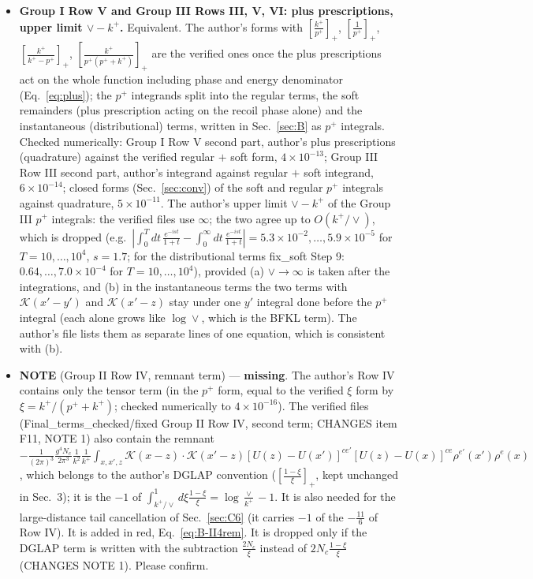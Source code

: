 \documentclass[9pt]{article}
\numberwithin{equation}{section}
\begin{document}
\begin{itemize}
\item[A4] \textbf{Group I Row V and Group III Rows III, V, VI: plus prescriptions, upper limit $\vee-k^{+}$.} Equivalent. The author's forms with $[\frac{k^{+}}{p^{+}}]_{+}$, $[\frac{1}{p^{+}}]_{+}$, $[\frac{k^{+}}{k^{+}-p^{+}}]_{+}$, $[\frac{k^{+}}{p^{+}(p^{+}+k^{+})}]_{+}$ are the verified ones once the plus prescriptions act on the whole function including phase and energy denominator (Eq.~\eqref{eq:plus}); the $p^{+}$ integrands split into the regular terms, the soft remainders (plus prescription acting on the recoil phase alone) and the instantaneous (distributional) terms, written in Sec.~\ref{sec:B} as $p^{+}$ integrals. Checked numerically: Group I Row V second part, author's plus prescriptions (quadrature) against the verified regular $+$ soft form, $4\times10^{-13}$; Group III Row III second part, author's integrand against regular $+$ soft integrand, $6\times10^{-14}$; closed forms (Sec.~\ref{sec:conv}) of the soft and regular $p^{+}$ integrals against quadrature, $5\times10^{-11}$. The author's upper limit $\vee-k^{+}$ of the Group III $p^{+}$ integrals: the verified files use $\infty$; the two agree up to $O(k^{+}/\vee)$, which is dropped (e.g.\ $|\int_{0}^{T}dt\,\frac{e^{-ist}}{1+t}-\int_{0}^{\infty}dt\,\frac{e^{-ist}}{1+t}|=5.3\times10^{-2},\dots,5.9\times10^{-5}$ for $T=10,\dots,10^{4}$, $s=1.7$; for the distributional terms fix\_soft Step 9: $0.64,\dots,7.0\times10^{-4}$ for $T=10,\dots,10^{4}$), provided (a) $\vee\to\infty$ is taken after the integrations, and (b) in the instantaneous terms the two terms with $\mathcal{K}(x'-y')$ and $\mathcal{K}(x'-z)$ stay under one $y'$ integral done before the $p^{+}$ integral (each alone grows like $\log\vee$, which is the BFKL term). The author's file lists them as separate lines of one equation, which is consistent with (b).
\item[A5] {\color{red}\textbf{NOTE} (Group II Row IV, remnant term) --- \textbf{missing}. The author's Row IV contains only the tensor term (in the $p^{+}$ form, equal to the verified $\xi$ form by $\xi=k^{+}/(p^{+}+k^{+})$; checked numerically to $4\times10^{-16}$). The verified files (Final\_terms\_checked/fixed Group II Row IV, second term; CHANGES item F11, NOTE 1) also contain the remnant $-\frac{1}{(2\pi)^{3}}\frac{g^{4}N_{c}}{2\pi^{3}}\frac{1}{k^{2}}\frac{1}{k^{+}}\int_{x,x',z}\mathcal{K}(x-z)\cdot\mathcal{K}(x'-z)[U(z)-U(x')]^{ce'}[U(z)-U(x)]^{ce}\rho^{e'}(x')\rho^{e}(x)$, which belongs to the author's DGLAP convention ($[\frac{1-\xi}{\xi}]_{+}$, kept unchanged in Sec.~3); it is the $-1$ of $\int_{k^{+}/\vee}^{1}d\xi\frac{1-\xi}{\xi}=\log\frac{\vee}{k^{+}}-1$. It is also needed for the large-distance tail cancellation of Sec.~\ref{sec:C6} (it carries $-1$ of the $-\frac{11}{6}$ of Row IV). It is added in red, Eq.~\eqref{eq:B-II4rem}. It is dropped only if the DGLAP term is written with the subtraction $\frac{2N_{c}}{\xi}$ instead of $2N_{c}\frac{1-\xi}{\xi}$ (CHANGES NOTE 1). Please confirm.}

\end{itemize}
\end{document}
